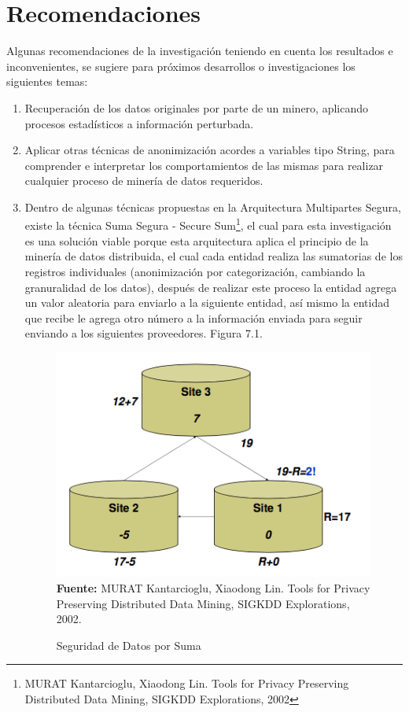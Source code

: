 \documentclass[a4paper,openright,12pt]{book}
\theoremstyle{definition}
\theoremstyle{remark}
\begin{document}
\section{Recomendaciones}
Algunas recomendaciones de la investigación teniendo en cuenta los resultados e inconvenientes, se sugiere para próximos desarrollos o investigaciones los siguientes temas:
\begin{enumerate}
	\item Recuperación de los datos originales por parte de un minero, aplicando procesos estadísticos a información perturbada.
    \item Aplicar otras técnicas de anonimización acordes a variables tipo String, para comprender e interpretar los comportamientos de las mismas para realizar cualquier proceso de minería de datos requeridos.
    \item Dentro de algunas técnicas propuestas en la Arquitectura Multipartes Segura, existe la técnica Suma Segura - Secure Sum\footnote{MURAT Kantarcioglu, Xiaodong Lin. Tools for Privacy Preserving Distributed Data Mining, SIGKDD Explorations, 2002}, el cual para esta investigación es una solución viable porque esta arquitectura aplica el principio de la minería de datos distribuida, el cual cada entidad realiza las sumatorias de los registros individuales (anonimización por categorización, cambiando la granuralidad de los datos), después de realizar este proceso la entidad agrega un valor aleatoria para enviarlo a la siguiente entidad, así mismo la entidad que recibe le agrega otro número a la información enviada para seguir enviando a los siguientes proveedores. Figura 7.1.
\begin{figure}[h]
\centering
\caption{Seguridad de Datos por Suma} 
\includegraphics[scale=0.47]{arq2}
\label{fig:Tabla1}
\\ \textbf{Fuente: }MURAT Kantarcioglu, Xiaodong Lin. Tools for Privacy Preserving Distributed Data Mining, SIGKDD Explorations, 2002.
\end{figure}
\end{enumerate}
\end{document}
